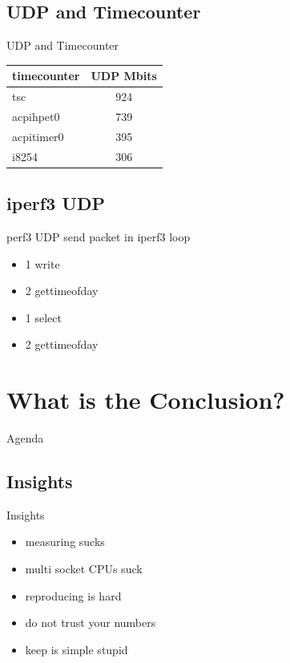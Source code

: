 \documentclass[14pt,aspectratio=169]{beamer}
\begin{document}
\subsection{UDP and Timecounter}
\begin{frame}{UDP and Timecounter}
\begin{tabular}{l|c}
    timecounter	& UDP Mbits \\
    \hline
    tsc		& 924 \\
    acpihpet0	& 739 \\
    acpitimer0	& 395 \\
    i8254	& 306 \\
\end{tabular}
\end{frame}

\subsection{iperf3 UDP}
\begin{frame}{perf3 UDP}
send packet in iperf3 loop
\begin{itemize}
    \item 1 write
    \item 2 gettimeofday
    \item 1 select
    \item 2 gettimeofday
\end{itemize}
\end{frame}

\section{What is the Conclusion?}

\begin{frame}{Agenda}
\setcounter{tocdepth}{1}
\tableofcontents[currentsection]
\end{frame}

\subsection{Insights}
\begin{frame}{Insights}
\begin{itemize}
    \item measuring sucks
    \item multi socket CPUs suck
    \item reproducing is hard
    \item do not trust your numbers
    \item keep is simple stupid
\end{itemize}
\end{frame}
\end{document}
